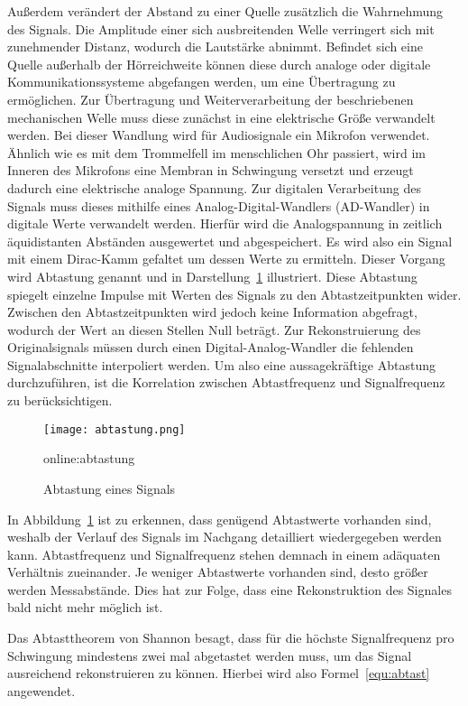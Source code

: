 Außerdem verändert der Abstand zu einer Quelle zusätzlich die Wahrnehmung des Signals. Die Amplitude einer sich ausbreitenden Welle verringert sich mit zunehmender Distanz, wodurch die Lautstärke abnimmt. Befindet sich eine Quelle außerhalb der Hörreichweite können diese durch analoge oder digitale Kommunikationssysteme abgefangen werden, um eine Übertragung zu ermöglichen. Zur Übertragung und Weiterverarbeitung der beschriebenen mechanischen Welle muss diese zunächst in eine elektrische Größe verwandelt werden. Bei dieser Wandlung wird für Audiosignale ein Mikrofon verwendet. Ähnlich wie es mit dem Trommelfell im menschlichen Ohr passiert, wird im Inneren des Mikrofons eine Membran in Schwingung versetzt und erzeugt dadurch eine elektrische analoge Spannung.
Zur digitalen Verarbeitung des Signals muss dieses mithilfe eines Analog-Digital-Wandlers
(AD-Wandler) in digitale Werte verwandelt werden. Hierfür wird die Analogspannung in zeitlich äquidistanten Abständen ausgewertet und abgespeichert. Es wird also ein Signal mit einem Dirac-Kamm gefaltet um dessen Werte zu ermitteln. Dieser Vorgang wird Abtastung genannt und in Darstellung~\ref{fig:abtastung} illustriert. Diese Abtastung spiegelt einzelne Impulse mit Werten des Signals zu den Abtastzeitpunkten wider. Zwischen den Abtastzeitpunkten wird jedoch keine Information abgefragt, wodurch der Wert an diesen Stellen Null beträgt. Zur Rekonstruierung des Originalsignals müssen durch einen Digital-Analog-Wandler die fehlenden Signalabschnitte interpoliert werden. Um also eine aussagekräftige Abtastung durchzuführen, ist die Korrelation zwischen Abtastfrequenz und Signalfrequenz zu berücksichtigen.


\begin{figure}[H]
	\centering
	\texttt{[image: abtastung.png]}
	\caption[Abtastung eines Signals]{Abtastung eines Signals} \gls{online:abtastung}
	\label{fig:abtastung}
\end{figure}

In Abbildung~\ref{fig:abtastung} ist zu erkennen, dass genügend Abtastwerte vorhanden sind, weshalb der Verlauf des Signals im Nachgang detailliert wiedergegeben werden kann. Abtastfrequenz und Signalfrequenz stehen demnach in einem adäquaten Verhältnis zueinander. Je weniger Abtastwerte vorhanden sind, desto größer werden Messabstände. Dies hat zur Folge, dass eine Rekonstruktion des Signales bald nicht mehr möglich ist.\cite{masteraudio}

Das Abtasttheorem von Shannon besagt, dass für die höchste Signalfrequenz pro Schwingung mindestens zwei mal abgetastet werden muss, um das Signal ausreichend rekonstruieren zu können. Hierbei wird also Formel~\ref{equ:abtast} angewendet.

